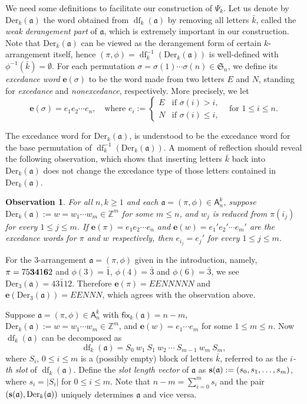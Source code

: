 \documentclass[12pt]{amsart} %
\numberwithin{equation}{section}
\theoremstyle{plain}
\newtheorem{Observation}[theorem]{Observation}
\theoremstyle{definition}
\newcommand{\Z}{\mathbb{Z}}
\newcommand\A{\mathsf{A}}
\def\Der{\mathrm{Der}}
\def\fix{\mathsf{fix}}
\def\S{\mathfrak{S}}
\def\a{\mathfrak{a}}
\def\s{\operatorname{{\bf s}}}
\def\df{\operatorname{df}}
\def\s{\operatorname{{\bf s}}}
\def\ee{\mathbf{e}}
\def\neg#1{{{{\bar#1}}}}
\begin{document}
We need some definitions to facilitate our construction of $\Psi_k$. 
Let us denote by 
$\Der_k(\a)$
the word obtained from $\df_k(\a)$ by removing all letters $\neg k$, called the  {\em weak derangement part} of $\a$, which is extremely  important in our construction. Note that $\Der_k(\a)$ can be viewed as the derangement form of certain $k$-arrangement itself, hence $(\pi,\phi)=\df_k^{-1}(\Der_k(\a))$ is well-defined with $\phi^{-1}(\neg k)=\emptyset$. For each permutation $\sigma=\sigma(1)\cdots\sigma(n)\in\S_n$, we define its {\em excedance word} $\ee(\sigma)$ to be the word made from two letters $E$ and $N$, standing for {\em excedance} and {\em nonexcedance}, respectively. More precisely, we let
$$\ee(\sigma)=e_1e_2\cdots e_n, \quad \text{where } e_i:=\begin{cases}
E & \text{if $\sigma(i)>i$,}\\
N & \text{if $\sigma(i)\le i$,}
\end{cases}\quad \text{for }1\le i\le n.$$

The excedance word for $\Der_k(\a)$, is understood to be the excedance word for the base permutation of $\df_k^{-1}(\Der_k(\a))$. A moment of reflection should reveal the following observation, which shows that inserting letters $\neg k$ back into $\Der_k(\a)$ does not change the excedance type of those letters contained in $\Der_k(\a)$.
\begin{Observation}\label{exc word}
For all $n,k\ge 1$ and each $\a=(\pi,\phi)\in\A_n^k$, suppose $\Der_k(\a):=w=w_1\cdots w_m\in\Z^m$ for some $m\le n$, and $w_j$ is reduced from $\pi(i_j)$ for every $1\le j\le m$. If $\ee(\pi)=e_1e_2\cdots e_n$ and $\ee(w)=e_1'e_2'\cdots e_m'$ are the excedance words for $\pi$ and $w$ respectively, then $e_{i_j}=e_j'$ for every $1\le j\le m$.
\end{Observation}

For the $3$-arrangement $\a=(\pi,\phi)$ given in the introduction, namely, $\pi=75{\bf3}{\bf4}1{\bf6}2$ and $\phi(3)=\neg 1$, $\phi(4)=\neg 3$ and $\phi(6)=\neg 3$, we see $\Der_3(\a)=43\neg112$. Therefore $\ee(\pi)=EENNNNN$ and $\ee(\Der_3(\a))=EENNN$, which agrees with the observation above.

Suppose $\a=(\pi,\phi)\in\A_n^k$ with $\fix_k(\a)=n-m$, $\Der_k(\a):=w=w_1 \cdots w_{m}\in\Z^m$, and $\ee(w)=e_1\cdots e_m$ for some $1\le m\le n$. Now $\df_k(\a)$ can be decomposed as 
$$\df_k(\a)=S_0\:w_1\:S_1\:w_2\:\cdots\:S_{m-1}\:w_m\:S_m,$$
where $S_i$, $0\le i\le m$ is a (possibly empty) block of letters $\neg k$, referred to as the {\em $i$-th slot} of $\df_k(\a)$. Define the {\em slot length vector} of $\a$ as $\s(\a):=(s_0,s_1,\ldots,s_{m})$, where $s_i=|S_i|$ for $0\le i\le m$. Note that $n-m=\sum_{i=0}^{m}s_i$ and the pair $(\s(\a),\Der_k(\a))$ uniquely determines $\a$ and vice versa. 
\end{document}
